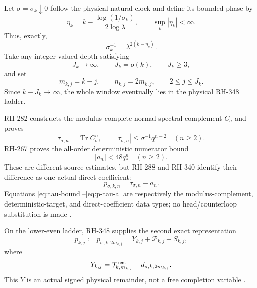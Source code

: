 \documentclass[11pt]{article}
\theoremstyle{remark}
\newcommand{\Tr}{\operatorname{Tr}}
\newcommand{\cP}{\mathcal P}
\newcommand{\cT}{\mathcal T}
\begin{document}
Let $\sigma=\sigma_k\downarrow0$ follow the physical natural clock and
define its bounded phase by
\begin{equation}\label{eq:clock}
 \eta_k=k-\frac{\log(1/\sigma_k)}{2\log\lambda},
 \qquad \sup_k|\eta_k|<\infty.
\end{equation}
Thus, exactly,
\begin{equation}\label{eq:sigma-clock}
 \sigma_k^{-1}=\lambda^{2(k-\eta_k)}.
\end{equation}
Take any integer-valued depth satisfying
\begin{equation}\label{eq:window}
 J_k\longrightarrow\infty,\qquad J_k=o(k),\qquad J_k\ge3,
\end{equation}
and set
\begin{equation}\label{eq:indices}
 m_{k,j}=k-j,\qquad n_{k,j}=2m_{k,j},\qquad 2\le j\le J_k.
\end{equation}
Since $k-J_k\to\infty$, the whole window eventually lies in the physical
RH-348 ladder.

RH-282 constructs the modulus-complete normal spectral complement
$C_\sigma$ and proves
\begin{equation}\label{eq:tau-bound}
 \tau_{\sigma,n}=\Tr C_\sigma^n,\qquad
 |\tau_{\sigma,n}|\le\sigma^{-1}q^{n-2}\quad(n\ge2).
\end{equation}
RH-267 proves the all-order deterministic numerator bound
\begin{equation}\label{eq:a-bound}
 |a_n|<48q_*^n\quad(n\ge2).
\end{equation}
These are different source estimates, but RH-288 and RH-340 identify their
difference as one actual direct coefficient:
\begin{equation}\label{eq:p-tau-a}
 p_{\sigma,k,n}=\tau_{\sigma,n}-a_n.
\end{equation}
Equations \eqref{eq:tau-bound}--\eqref{eq:p-tau-a} are respectively the
modulus-complement, deterministic-target, and direct-coefficient data types;
no head/counterloop substitution is made
\citep{WangSpectralTail2026,WangUnifiedEnvelope2026,
WangGluing2026,WangSynchronization2026}.

On the lower-even ladder, RH-348 supplies the second exact representation
\begin{equation}\label{eq:p-YPS}
 \boxed{
 p_{k,j}:=p_{\sigma,k,2m_{k,j}}
 =Y_{k,j}+\cP_{k,j}-S_{k,j},}
\end{equation}
where
\begin{equation}\label{eq:Y-actual}
 Y_{k,j}=\cT_{k,m_{k,j}}^{\rm rest}
          -d_{\sigma,k,2m_{k,j}}.
\end{equation}
This $Y$ is an actual signed physical remainder, not a free completion
variable \citep{WangLowerLadder2026,WangSignedCompletion2026}.
\end{document}
